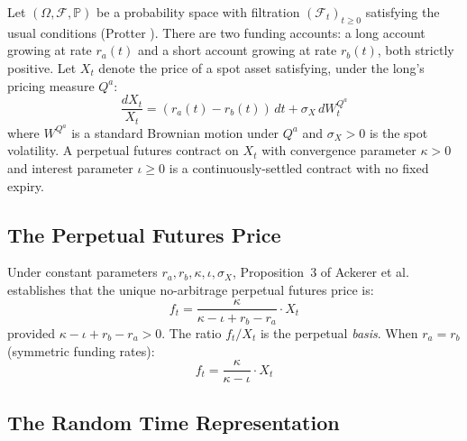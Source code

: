 \documentclass[10pt,twocolumn]{article}
\theoremstyle{plain}
\theoremstyle{definition}
\newcommand{\Qa}{Q^a}
\newcommand{\Prob}{\mathbb{P}}
\newcommand{\F}{\mathcal{F}}
\begin{document}
Let $(\Omega, \F, \Prob)$ be a probability space with filtration
$(\F_t)_{t\geq 0}$ satisfying the usual conditions (Protter
\cite{Protter2005}). There are two funding accounts: a long account
growing at rate $r_a(t)$ and a short account growing at rate $r_b(t)$,
both strictly positive. Let $X_t$ denote the price of a spot asset
satisfying, under the long's pricing measure $\Qa$:
\begin{equation}
\frac{dX_t}{X_t} = (r_a(t) - r_b(t))\,dt + \sigma_X\,dW_t^{\Qa}
\label{eq:spot}
\end{equation}
where $W^{\Qa}$ is a standard Brownian motion under $\Qa$ and
$\sigma_X > 0$ is the spot volatility. A perpetual futures contract
on $X_t$ with convergence parameter $\kappa > 0$ and interest
parameter $\iota \geq 0$ is a continuously-settled contract with
no fixed expiry.

\subsection{The Perpetual Futures Price}

Under constant parameters $r_a, r_b, \kappa, \iota, \sigma_X$,
Proposition~3 of Ackerer et al.\ \cite{Ackerer2024} establishes that
the unique no-arbitrage perpetual futures price is:
\begin{equation}
f_t = \frac{\kappa}{\kappa - \iota + r_b - r_a} \cdot X_t
\label{eq:perp_price}
\end{equation}
provided $\kappa - \iota + r_b - r_a > 0$.
The ratio $f_t/X_t$ is the perpetual \textit{basis}. When
$r_a = r_b$ (symmetric funding rates):
\begin{equation}
f_t = \frac{\kappa}{\kappa - \iota} \cdot X_t
\label{eq:perp_symmetric}
\end{equation}

\subsection{The Random Time Representation}
\label{sec:rtr}
\end{document}
